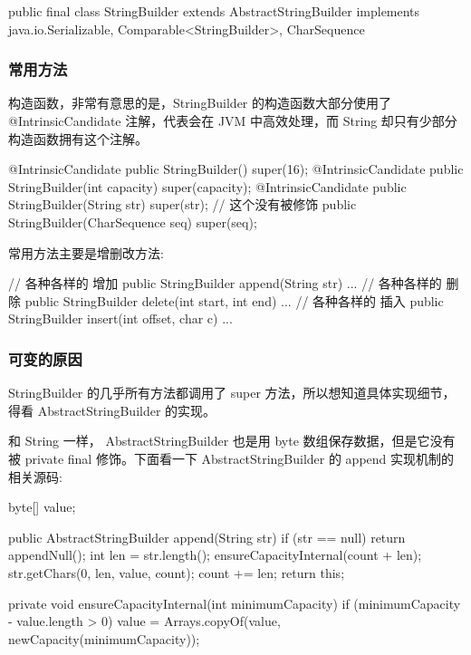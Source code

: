 \begin{Java}
public final class StringBuilder extends AbstractStringBuilder
    implements java.io.Serializable, Comparable<StringBuilder>, CharSequence
\end{Java}

\subsubsection{常用方法}

构造函数，非常有意思的是，StringBuilder 的构造函数大部分使用了 @IntrinsicCandidate 注解，代表会在 JVM 中高效处理，而 String 却只有少部分构造函数拥有这个注解。

\begin{Java}
@IntrinsicCandidate
public StringBuilder() { super(16); }
@IntrinsicCandidate
public StringBuilder(int capacity) { super(capacity); }
@IntrinsicCandidate
public StringBuilder(String str) { super(str); }
// 这个没有被修饰
public StringBuilder(CharSequence seq) { super(seq); }
\end{Java}

常用方法主要是增删改方法:
\begin{Java}
// 各种各样的 增加
public StringBuilder append(String str) { ... }
// 各种各样的 删除
public StringBuilder delete(int start, int end) { ... }
// 各种各样的 插入
public StringBuilder insert(int offset, char c) { ... }
\end{Java}

\subsubsection{可变的原因}

StringBuilder 的几乎所有方法都调用了 super 方法，所以想知道具体实现细节，得看 AbstractStringBuilder 的实现。

和 String 一样， AbstractStringBuilder 也是用 byte 数组保存数据，但是它没有被 private final 修饰。下面看一下 AbstractStringBuilder 的 append 实现机制的相关源码:

\begin{Java}
byte[] value;

public AbstractStringBuilder append(String str) {
    if (str == null)
        return appendNull();
    int len = str.length();
    ensureCapacityInternal(count + len);
    str.getChars(0, len, value, count);
    count += len;
    return this;
}

private void ensureCapacityInternal(int minimumCapacity) {
    if (minimumCapacity - value.length > 0) {
        value = Arrays.copyOf(value, newCapacity(minimumCapacity));
    }
}
\end{Java}

